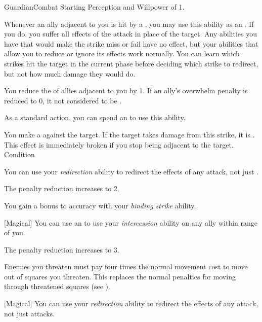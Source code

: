     \begin{feat}{Guardian}{Combat}
        \featpre Starting Perception and Willpower of 1.
        \featben

         Whenever an ally adjacent to you is hit by a , you may use this ability as an .
        If you do, you suffer all effects of the attack in place of the target.
        Any abilities you have that would make the strike miss or fail have no effect, but your abilities that allow you to reduce or ignore its effects work normally.
        You can learn which strikes hit the target in the current phase before deciding which strike to redirect, but not how much damage they would do.

         You reduce the  of allies adjacent to you by 1.
        If an ally's overwhelm penalty is reduced to 0, it not considered to be .

         As a standard action, you can spend an  to use this ability.
        \begin{ability}
            \begin{spelltargetinginfo}
            \end{spelltargetinginfo}
            \begin{spelleffects}
                \spelleffect You make a  against the target.
                If the target takes damage from this strike, it is \immobilized.
                This effect is immediately broken if you stop being adjacent to the target.
                \spelldur Condition
            \end{spelleffects}
        \end{ability}

         You can use your \textit{redirection} ability to redirect the effects of any  attack, not just .

         The penalty reduction increases to 2.

         You gain a  bonus to accuracy with your \textit{binding strike} ability.

        [Magical] You can use an  to use your \textit{intercession} ability on any ally within \rnglong range of you.

         The penalty reduction increases to 3.

         Enemies you threaten must pay four times the normal movement cost to move out of squares you threaten.
        This replaces the normal penalties for moving through threatened squares (see ).

        [Magical] You can use your \textit{redirection} ability to redirect the effects of any attack, not just  attacks. 
    \end{feat}

